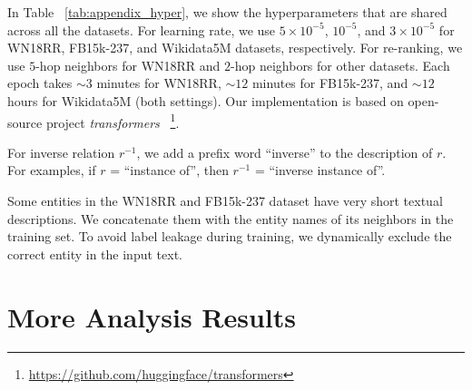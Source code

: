 \documentclass[11pt]{article}
\begin{document}
\begin{table}[ht]
\centering
{}
\caption{Shared hyperparameters for our proposed SimKGC model.}
\label{tab:appendix_hyper}
\end{table}

In Table ~\ref{tab:appendix_hyper},
we show the hyperparameters that are shared across all the datasets.
For learning rate,
we use $5\times10^{-5}$, $10^{-5}$, and $3\times10^{-5}$
for WN18RR, FB15k-237, and Wikidata5M datasets, respectively.
For re-ranking,
we use $5$-hop neighbors for WN18RR and $2$-hop neighbors for other datasets.
Each epoch takes $\sim3$ minutes for WN18RR,
$\sim12$ minutes for FB15k-237,
and $\sim12$ hours for Wikidata5M (both settings).
Our implementation is based on open-source project \emph{transformers}
~\footnote{\url{https://github.com/huggingface/transformers}}.

For inverse relation $r^{-1}$,
we add a prefix word ``inverse'' to the description of $r$.
For examples,
if $r$ = ``instance of'',
then $r^{-1}$ = ``inverse instance of''.

Some entities in the WN18RR and FB15k-237 dataset
have very short textual descriptions.
We concatenate them with the entity names of its neighbors in the training set.
To avoid label leakage during training,
we dynamically exclude the correct entity in the input text.

\section{More Analysis Results} \label{app:analysis}
\end{document}

